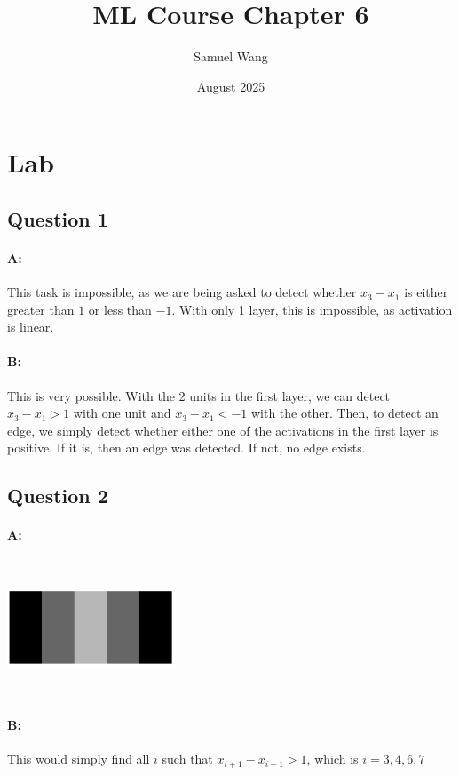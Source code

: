 \documentclass{article}
\title{ML Course Chapter 6}
\author{Samuel Wang}
\date{August 2025}
\begin{document}
\maketitle

\section{Lab}

\subsection{Question 1}

\paragraph{A: } This task is impossible, as we are being asked to detect whether $x_3-x_1$ is either greater than $1$ or less than $-1$. With only 1 layer, this is impossible, as activation is linear.

\paragraph{B: } This is very possible. With the 2 units in the first layer, we can detect $x_3-x_1>1$ with one unit and $x_3-x_1<-1$ with the other. Then, to detect an edge, we simply detect whether either one of the activations in the first layer is positive. If it is, then an edge was detected. If not, no edge exists.

\subsection{Question 2}

\paragraph{A: } \includegraphics[width=5cm, height=4cm]{Week 8 2A.png}

\paragraph{B: } This would simply find all $i$ such that $x_{i+1}-x_{i-1}>1$, which is $i=3, 4, 6, 7$
\end{document}
